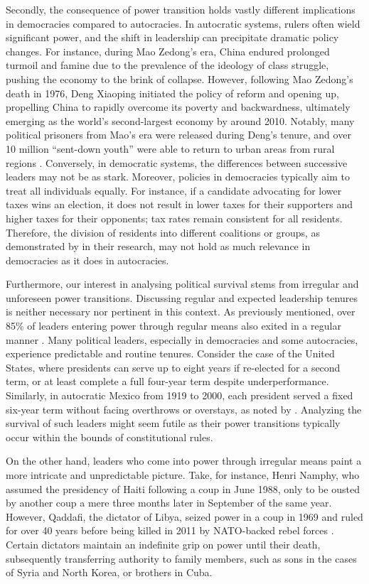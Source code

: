 \documentclass[
  12pt,
  a4paper,
  12pt]{article}
\begin{document}
Secondly, the consequence of power transition holds vastly different
implications in democracies compared to autocracies. In autocratic
systems, rulers often wield significant power, and the shift in
leadership can precipitate dramatic policy changes. For instance, during
Mao Zedong's era, China endured prolonged turmoil and famine due to the
prevalence of the ideology of class struggle, pushing the economy to the
brink of collapse. However, following Mao Zedong's death in 1976, Deng
Xiaoping initiated the policy of reform and opening up, propelling China
to rapidly overcome its poverty and backwardness, ultimately emerging as
the world's second-largest economy by around 2010. Notably, many
political prisoners from Mao's era were released during Deng's tenure,
and over 10 million ``sent-down youth'' were able to return to urban
areas from rural regions \citep{spence1990search}. Conversely, in
democratic systems, the differences between successive leaders may not
be as stark. Moreover, policies in democracies typically aim to treat
all individuals equally. For instance, if a candidate advocating for
lower taxes wins an election, it does not result in lower taxes for
their supporters and higher taxes for their opponents; tax rates remain
consistent for all residents. Therefore, the division of residents into
different coalitions or groups, as demonstrated by
\citet{buenodemesquita2003} in their research, may not hold as much
relevance in democracies as it does in autocracies.

Furthermore, our interest in analysing political survival stems from
irregular and unforeseen power transitions. Discussing regular and
expected leadership tenures is neither necessary nor pertinent in this
context. As previously mentioned, over 85\% of leaders entering power
through regular means also exited in a regular manner
\citep{goemans2009}. Many political leaders, especially in democracies
and some autocracies, experience predictable and routine tenures.
Consider the case of the United States, where presidents can serve up to
eight years if re-elected for a second term, or at least complete a full
four-year term despite underperformance. Similarly, in autocratic Mexico
from 1919 to 2000, each president served a fixed six-year term without
facing overthrows or overstays, as noted by \citep{klesner2019}.
Analyzing the survival of such leaders might seem futile as their power
transitions typically occur within the bounds of constitutional rules.

On the other hand, leaders who come into power through irregular means
paint a more intricate and unpredictable picture. Take, for instance,
Henri Namphy, who assumed the presidency of Haiti following a coup in
June 1988, only to be ousted by another coup a mere three months later
in September of the same year. However, Qaddafi, the dictator of Libya,
seized power in a coup in 1969 and ruled for over 40 years before being
killed in 2011 by NATO-backed rebel forces \citep{goemans2009}. Certain
dictators maintain an indefinite grip on power until their death,
subsequently transferring authority to family members, such as sons in
the cases of Syria and North Korea, or brothers in Cuba.
\end{document}

